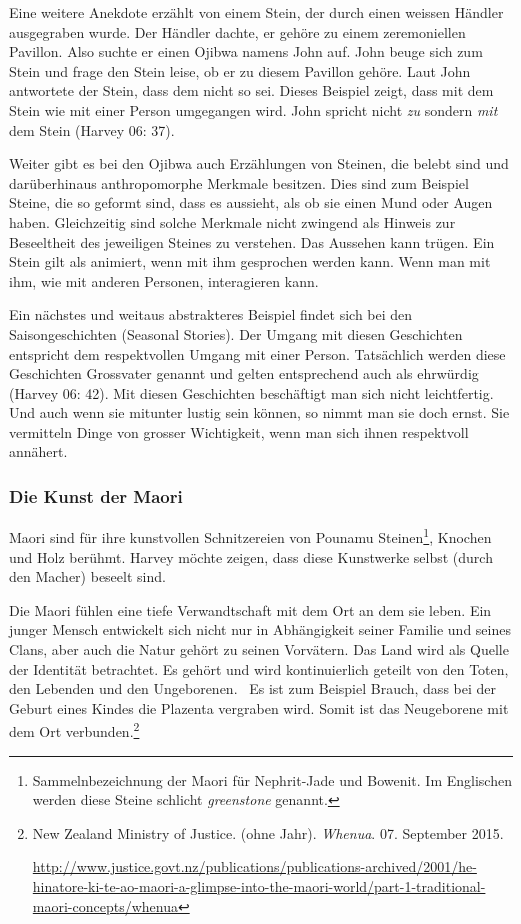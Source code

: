 Eine weitere Anekdote erzählt von einem Stein, der durch einen weissen Händler ausgegraben wurde. Der Händler dachte, er gehöre zu einem zeremoniellen Pavillon. Also suchte er einen Ojibwa namens John auf. John beuge sich zum Stein und frage den Stein leise, ob er zu diesem Pavillon gehöre. Laut John antwortete der Stein, dass dem nicht so sei. Dieses Beispiel zeigt, dass mit dem Stein wie mit einer Person umgegangen wird. John spricht nicht \emph{zu} sondern \emph{mit} dem Stein (Harvey 06: 37). 

Weiter gibt es bei den Ojibwa auch Erzählungen von Steinen, die belebt sind und darüberhinaus anthropomorphe Merkmale besitzen. Dies sind zum Beispiel Steine, die so geformt sind, dass es aussieht, als ob sie einen Mund oder Augen haben. Gleichzeitig sind solche Merkmale nicht zwingend als Hinweis zur Beseeltheit des jeweiligen Steines zu verstehen. Das Aussehen kann trügen. Ein Stein gilt als animiert, wenn mit ihm gesprochen werden kann. Wenn man mit ihm, wie mit anderen Personen, interagieren kann. 

Ein nächstes und weitaus abstrakteres Beispiel findet sich bei den Saison\-geschichten (Seasonal Stories). Der Umgang mit diesen Geschichten entspricht dem respektvollen Umgang mit einer Person. Tatsächlich werden diese Geschichten Grossvater genannt und gelten entsprechend auch als ehrwürdig (Harvey 06: 42). Mit diesen Geschichten beschäftigt man sich nicht leichtfertig. Und auch wenn sie mitunter lustig sein können, so nimmt man sie doch ernst. Sie vermitteln Dinge von grosser Wichtigkeit, wenn man sich ihnen respektvoll annähert. 

\subsubsection*{Die Kunst der Maori}
Maori sind für ihre kunstvollen Schnitzereien von Pounamu Steinen\footnote{Sammelnbezeichnung der Maori für Nephrit-Jade und Bowenit. Im Englischen werden diese Steine schlicht \emph{greenstone} genannt.}, Knochen und Holz berühmt. Harvey möchte zeigen, dass diese Kunstwerke selbst (durch den Macher) beseelt sind.

Die Maori fühlen eine tiefe Verwandtschaft mit dem Ort an dem sie leben. Ein junger Mensch entwickelt sich nicht nur in Abhängigkeit seiner Familie und seines Clans, aber auch die Natur gehört zu seinen Vorvätern. Das Land wird als Quelle der Identität betrachtet. Es gehört und wird kontinuierlich geteilt von den Toten, den Lebenden und den Ungeborenen. ~Es ist zum Beispiel Brauch, dass bei der Geburt eines Kindes die Plazenta vergraben wird. Somit ist das Neugeborene mit dem Ort verbunden.\footnote{New Zealand Ministry of Justice. (ohne Jahr). \emph{Whenua}. 07. September 2015.

	\url{http://www.justice.govt.nz/publications/publications-archived/2001/he-hinatore-ki-te-ao-maori-a-glimpse-into-the-maori-world/part-1-traditional-maori-concepts/whenua}}


